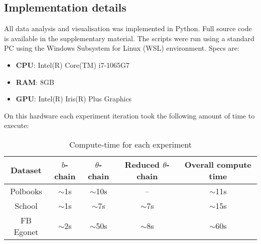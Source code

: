 \subsection{Implementation details}
\label{appdx:imp-details}

All data analysis and visualisation was implemented in Python. Full source code is available in the supplementary material. The scripts were run using a standard PC using the Windows Subsystem for Linux (WSL) environment. Specs are:

\begin{itemize}
	\item \textbf{CPU}: Intel(R) Core(TM) i7-1065G7
	\item \textbf{RAM}: 8GB
	\item \textbf{GPU}: Intel(R) Iris(R) Plus Graphics
\end{itemize}

On this hardware each experiment iteration took the following amount of time to execute:

\begin{table}[!h]
	\centering
	\caption{Compute-time for each experiment}
	\label{tab:compute-time}
	\begin{tabular}{c|ccc|c}
		Dataset & $b$-chain & $\theta$-chain & Reduced $\theta$-chain & Overall compute time \\ \hline
		Polbooks & $\sim$1s & $\sim$10s & -- & $\sim$11s \\
		School & $\sim$1s & $\sim$7s & $\sim$7s & $\sim$15s \\
		FB Egonet & $\sim$2s & $\sim$50s & $\sim$8s & $\sim$60s
	\end{tabular}
\end{table}

